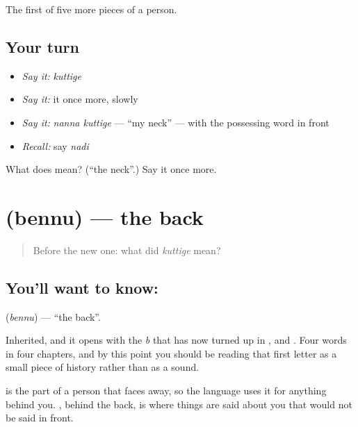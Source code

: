 \begin{grammarlens}[title={What you've built}]
The first of five more pieces of a person.
\end{grammarlens}

\subsection*{Your turn}
\begin{itemize}
\raggedright
  \item \emph{Say it:} \emph{kuttige}
  \item \emph{Say it:} it once more, slowly
  \item \emph{Say it:} \emph{nanna kuttige} — \textquotedblleft{}my neck\textquotedblright{} — with the possessing word in front
  \item \emph{Recall:} say \emph{nadi}
\end{itemize}

\begin{tcolorbox}[breakable,colback=teal!4,colframe=teal!35!black,title={Before you move on}]
What does  mean? (\textquotedblleft{}the neck\textquotedblright{}.) Say it once more.
\end{tcolorbox}
\section[\texorpdfstring{\kn{ಬೆನ್ನು} (bennu)}{ಬೆನ್ನು (bennu)}]{ (bennu) — the back}

\label{lesson:KA-C57-back}



\begin{quote}
Before the new one: what did \emph{kuttige} mean?
\end{quote}

\subsection*{You'll want to know: }
\textbf{} (\emph{bennu}) — \textquotedblleft{}the back\textquotedblright{}.

Inherited, and it opens with the \emph{b} that has now turned up in ,  and . Four words in four chapters, and by this point you should be reading that first letter as a small piece of history rather than as a sound.

 is the part of a person that faces away, so the language uses it for anything behind you.  , behind the back, is where things are said about you that would not be said in front.

